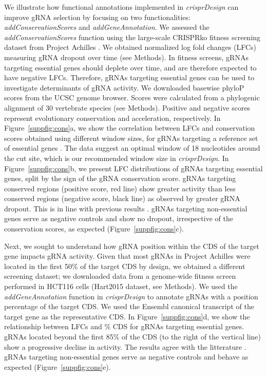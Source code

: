 \documentclass[pdftex,english,10pt]{article}
\begin{document}
We illustrate how functional annotations implemented in \textit{crisprDesign} can improve gRNA selection by focusing on two functionalities: \textit{addConservationScores} and \textit{addGeneAnnotation}. We assessed the \textit{addConservationScores} function using the large-scale CRISPRko fitness screening dataset from Project Achilles \citep{ceres}. We obtained normalized log fold changes (LFCs) measuring gRNA dropout over time (see Methods). In fitness screens, gRNAs targeting essential genes should deplete over time, and are therefore expected to have negative LFCs. Therefore, gRNAs targeting essential genes can be used to investigate determinants of gRNA activity. We downloaded basewise phyloP scores \citep{pollard2010detection} from the UCSC genome browser. Scores were calculated from a phylogenic alignment of 30 vertebrate species (see Methods). Positive and negative scores represent evolutionary conservation and acceleration, respectively.  In Figure~\ref{suppfig:cons}a, we show the correlation between LFCs and conservation scores obtained using different window sizes, for gRNAs targeting a reference set of essential genes \citep{hart2014}. The data suggest an optimal window of 18 nucleotides around the cut site, which is our recommended window size in \textit{crisprDesign}. In Figure~\ref{suppfig:cons}b, we present LFC distributions of gRNAs targeting essential genes, split by the sign of the gRNA conservation score. gRNAs targeting conserved regions (positive score, red line) show greater activity than less conserved regions (negative score, black line) as observed by greater gRNA dropout. This is in line with previous results \citep{crispro,ruleset3,pincer}. gRNAs targeting non-essential genes serve as negative controls and show no dropout, irrespective of the conservation scores, as expected (Figure~\ref{suppfig:cons}c). 

Next, we sought to understand how gRNA position within the CDS of the target gene impacts gRNA activity. Given that most gRNAs in Project Achilles were located in the first 50\% of the target CDS by design, we obtained a different screening dataset; we downloaded data from a genome-wide fitness screen performed in HCT116 cells (Hart2015 dataset, see Methods). We used the \textit{addGeneAnnotation} function in \textit{crisprDesign} to annotate gRNAs with a position percentage of the target CDS. We used the Ensembl canonical transcript of the target gene as the representative CDS. In Figure~\ref{suppfig:cons}d, we show the relationship between LFCs and \% CDS for gRNAs targeting essential genes. gRNAs located beyond the first 85\% of the CDS (to the right of the vertical line) show a progressive decline in activity. The results agree with the litterature \citep{azimuth}. gRNAs targeting non-essential genes serve as negative controls and behave as expected (Figure~\ref{suppfig:cons}e). 
\end{document}
